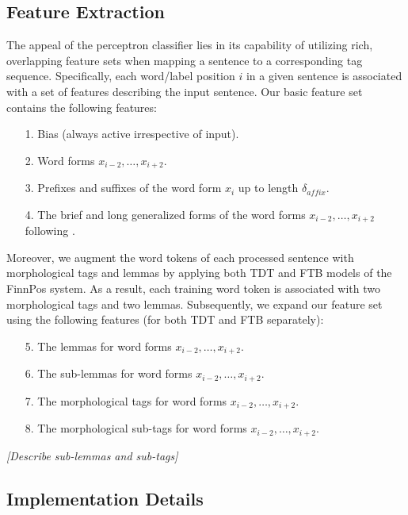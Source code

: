 \documentclass[11pt]{article}
\newcommand{\fixme}[1]{\textsl{[#1]}}
\begin{document}
\subsection{Feature Extraction}

The appeal of the perceptron classifier \citep{collins2002} lies in its capability of utilizing rich, overlapping feature sets when mapping a sentence to a corresponding tag sequence. Specifically, each word/label position $i$ in a given sentence is associated with  a set of features describing the input sentence. Our basic feature set contains the following features:

\begin{itemize}
\item[1.] Bias (always active irrespective of input).
\item[2.] Word forms $x_{i-2}, \dots, x_{i+2}$.
\item[3.] Prefixes and suffixes of the word form $x_i$ up to length $\delta_{affix}$.
\item[4.] The brief and long generalized forms of the word forms $x_{i-2}, \dots, x_{i+2}$ following \citet{collins2002}.
\end{itemize}

Moreover, we augment the word tokens of each processed sentence with morphological tags and lemmas by applying both TDT and FTB models of the FinnPos system. As a result, each training word token is associated with two morphological tags and two lemmas. Subsequently, we expand our feature set using the following features (for both TDT and FTB separately):

\begin{itemize}
\item[5.] The lemmas for word forms $x_{i-2}, \dots, x_{i+2}$. 
\item[6.] The sub-lemmas for word forms $x_{i-2}, \dots, x_{i+2}$. 
\item[7.] The morphological tags for word forms $x_{i-2}, \dots, x_{i+2}$.
\item[8.] The morphological sub-tags for word forms $x_{i-2}, \dots, x_{i+2}$.
\end{itemize}

\fixme{Describe sub-lemmas and sub-tags} 

\subsection{Implementation Details}
\label{sec: implementation details}
\end{document}
